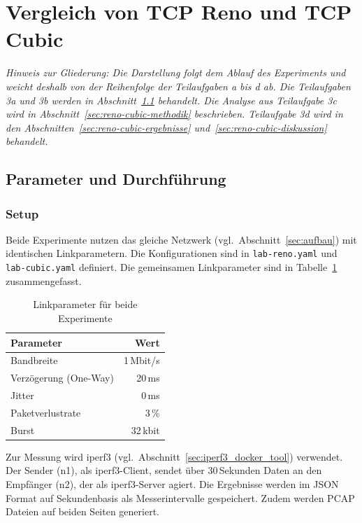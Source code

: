 \FloatBarrier
\section{Vergleich von TCP Reno und TCP Cubic}

\textit{Hinweis zur Gliederung: Die Darstellung folgt dem Ablauf des Experiments und weicht deshalb von der Reihenfolge der Teilaufgaben a bis d ab. Die Teilaufgaben 3a und 3b werden in Abschnitt~\ref{sec:reno-cubic-parameter} behandelt. Die Analyse aus Teilaufgabe 3c wird in Abschnitt~\ref{sec:reno-cubic-methodik} beschrieben. Teilaufgabe 3d wird in den Abschnitten~\ref{sec:reno-cubic-ergebnisse} und~\ref{sec:reno-cubic-diskussion} behandelt.}

\subsection{Parameter und Durchführung}\label{sec:reno-cubic-parameter}

\subsubsection{Setup}

Beide Experimente nutzen das gleiche Netzwerk (vgl.\ Abschnitt~\ref{sec:aufbau}) mit identischen Linkparametern.
Die Konfigurationen sind in \texttt{lab-reno.yaml} und \texttt{lab-cubic.yaml} definiert.
Die gemeinsamen Linkparameter sind in Tabelle~\ref{tab:reno_cubic_link} zusammengefasst.

\begin{table}[h]
    \centering
    \begin{tabular}{|l|r|}
        \hline
        \textbf{Parameter} & \textbf{Wert} \\ \hline
        Bandbreite & 1\,Mbit/s \\ \hline
        Verzögerung (One-Way) & 20\,ms \\ \hline
        Jitter & 0\,ms \\ \hline
        Paketverlustrate & 3\,\% \\ \hline
        Burst & 32\,kbit \\ \hline
    \end{tabular}
    \caption{Linkparameter für beide Experimente}\label{tab:reno_cubic_link}
\end{table}

Zur Messung wird iperf3 (vgl.\ Abschnitt~\ref{sec:iperf3_docker_tool}) verwendet.
Der Sender (n1), als iperf3-Client, sendet über 30\,Sekunden Daten an den Empfänger (n2), der als iperf3-Server agiert.
Die Ergebnisse werden im JSON Format auf Sekundenbasis als Messerintervalle gespeichert.
Zudem werden PCAP Dateien auf beiden Seiten generiert.

